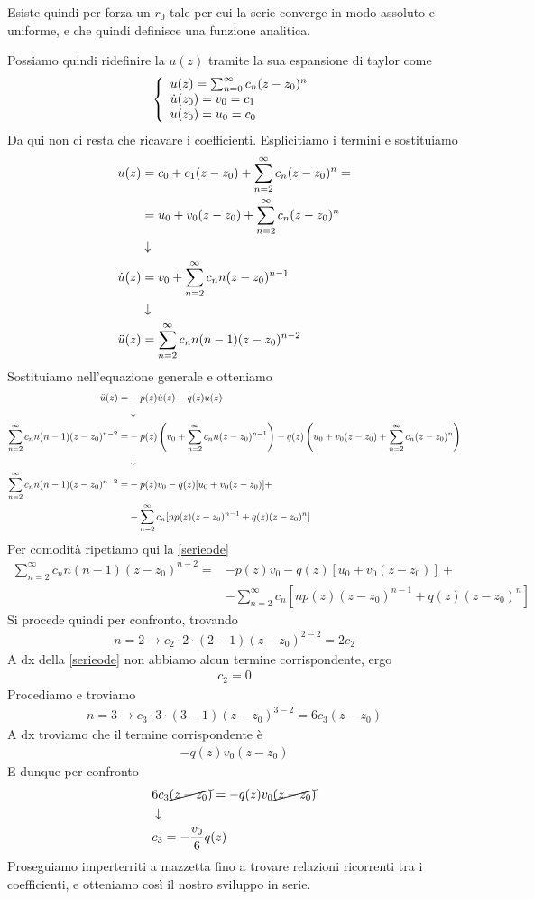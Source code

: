 Esiste quindi per forza un $r_0$ tale per cui la serie converge in modo assoluto e uniforme, e che quindi definisce una funzione analitica.

Possiamo quindi ridefinire la $u(z)$ tramite la sua espansione di taylor come
\begin{align}
	\triple{u(z) = \sum_{n=0}^{\infty} c_n(z-z_0)^n}{\dot{u}(z_0) = v_0 = c_1 \hfill}{u(z_0) = u_0 = c_0 \hfill}
\end{align}
Da qui non ci resta che ricavare i coefficienti. Esplicitiamo i termini e sostituiamo
\begin{align}
       u(z) &= c_0 + c_1 (z-z_0) + \sum_{n=2}^{\infty} c_n(z-z_0)^n = \nonumber \\
            &= u_0 + v_0 (z-z_0) + \sum_{n=2}^{\infty} c_n(z-z_0)^n \\ &\downarrow \nonumber \\
 \dot{u}(z) &= v_0 + \sum_{n=2}^{\infty} c_n n(z-z_0)^{n-1} \\ &\downarrow \nonumber \\
\ddot{u}(z) &= \sum_{n=2}^{\infty} c_n n(n-1)(z-z_0)^{n-2}
\end{align}
Sostituiamo nell'equazione generale e otteniamo
\begin{align}
	\ddot{u}(z) =& - p(z) \dot{u}(z) - q(z) u(z) \\ &\downarrow \nonumber \\
	\sum_{n=2}^{\infty} c_n n(n-1)(z-z_0)^{n-2} =& -p(z) \left(v_0 + \sum_{n=2}^{\infty} c_n n(z-z_0)^{n-1}\right) - q(z) \left( u_0 + v_0 (z-z_0) + \sum_{n=2}^{\infty} c_n(z-z_0)^n \right) \nonumber \\ &\downarrow \nonumber \\
	\sum_{n=2}^{\infty} c_n n(n-1)(z-z_0)^{n-2} =& -p(z)v_0 - q(z)[u_0 + v_0 (z-z_0) ] + \nonumber\\ 
	&- \sum_{n=2}^{\infty} c_n [np(z)(z-z_0)^{n-1} + q(z)(z-z_0)^n] \label{serieode}
\end{align}
\newpage
Per comodità ripetiamo qui la \ref{serieode}
\begin{align}
	\sum_{n=2}^{\infty} c_n n(n-1)(z-z_0)^{n-2} =& -p(z)v_0 - q(z)[u_0 + v_0 (z-z_0) ] + \nonumber\\ 
	&- \sum_{n=2}^{\infty} c_n [np(z)(z-z_0)^{n-1} + q(z)(z-z_0)^n]
\end{align}
Si procede quindi per confronto, trovando
\begin{align}
	n = 2 \to c_2 \cdot 2 \cdot (2-1) (z-z_0)^{2-2} = 2c_2
\end{align}
A dx della \ref{serieode} non abbiamo alcun termine corrispondente, ergo
\begin{align}
	c_2 = 0
\end{align}
Procediamo e troviamo
\begin{align}
	n = 3 \to c_3 \cdot 3 \cdot (3-1) (z-z_0)^{3-2} = 6c_3 (z-z_0)
\end{align}
A dx troviamo che il termine corrispondente è
\begin{align}
	- q(z)v_0 (z-z_0)
\end{align}
E dunque per confronto
\begin{align}
	&6c_3 \cancel{(z-z_0)} = - q(z)v_0 \cancel{(z-z_0)}\\ &\downarrow \nonumber \\
	&c_3 = -\frac{v_0}{6}q(z) 
\end{align}
Proseguiamo imperterriti a mazzetta fino a trovare relazioni ricorrenti tra i coefficienti, e otteniamo così il  nostro sviluppo in serie.

